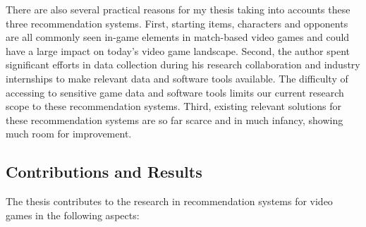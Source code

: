 There are also several practical reasons for my thesis taking into accounts these three recommendation systems. First, starting items, characters and opponents are all commonly seen in-game elements in match-based video games and could have a large impact on today's video game landscape.  Second, the author spent significant efforts in data collection during his research collaboration and industry internships to make relevant data and software tools available. The difficulty of accessing to sensitive game data and software tools limits our current research scope to these recommendation systems. Third, existing relevant solutions for these recommendation systems are so far scarce and in much infancy, showing much room for improvement. 

\subsection{Contributions and Results}
The thesis contributes to the research in recommendation systems for video games in the following aspects:
